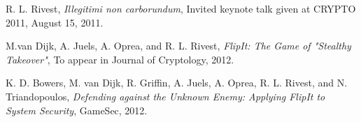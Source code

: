 \documentclass[a4paper]{article}
\begin{document}
\begin{thebibliography}{9}

  R. L. Rivest,
  \emph{Illegitimi non carborundum},
  Invited keynote talk given at CRYPTO 2011,
  August 15, 2011.

  M.van Dijk, A. Juels, A. Oprea, and R. L. Rivest,
  \emph{FlipIt: The Game of "Stealthy Takeover"},
  To appear in Journal of Cryptology,
  2012.

  K. D. Bowers, M. van Dijk, R. Griffin, A. Juels, A. Oprea, R. L. Rivest, and N. Triandopoulos,
  \emph{Defending against the Unknown Enemy: Applying FlipIt to System Security},
  GameSec,
  2012.

\end{thebibliography}
\end{document}
